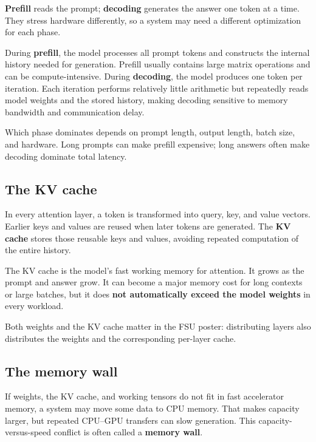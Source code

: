 \documentclass[10pt,a4paper]{article}
\newcommand{\term}[1]{\textbf{\color{navy}#1}}
\begin{document}
\begin{takeaway}
\textbf{Prefill} reads the prompt; \textbf{decoding} generates the answer one token at a time. They stress hardware differently, so a system may need a different optimization for each phase.
\end{takeaway}

During \term{prefill}, the model processes all prompt tokens and constructs the internal history needed for generation. Prefill usually contains large matrix operations and can be compute-intensive. During \term{decoding}, the model produces one token per iteration. Each iteration performs relatively little arithmetic but repeatedly reads model weights and the stored history, making decoding sensitive to memory bandwidth and communication delay.

Which phase dominates depends on prompt length, output length, batch size, and hardware. Long prompts can make prefill expensive; long answers often make decoding dominate total latency.

\subsection{The KV cache}

In every attention layer, a token is transformed into query, key, and value vectors. Earlier keys and values are reused when later tokens are generated. The \term{KV cache} stores those reusable keys and values, avoiding repeated computation of the entire history.

\begin{plainbox}
The KV cache is the model's fast working memory for attention. It grows as the prompt and answer grow. It can become a major memory cost for long contexts or large batches, but it does \textbf{not automatically exceed the model weights} in every workload.
\end{plainbox}

Both weights and the KV cache matter in the FSU poster: distributing layers also distributes the weights and the corresponding per-layer cache.

\subsection{The memory wall}

If weights, the KV cache, and working tensors do not fit in fast accelerator memory, a system may move some data to CPU memory. That makes capacity larger, but repeated CPU--GPU transfers can slow generation. This capacity-versus-speed conflict is often called a \term{memory wall}.
\end{document}
